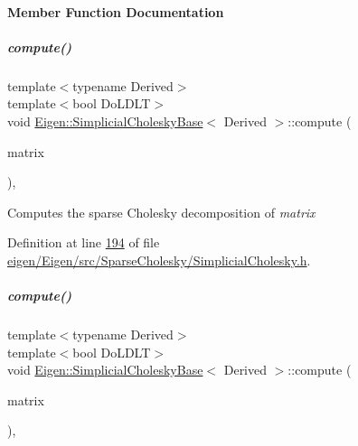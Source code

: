 \paragraph{Member Function Documentation}
\mbox{\label{group___sparse_cholesky___module_a9a741744dda2261cae26cddf96a35bf0}} 
\subparagraph{\texorpdfstring{compute()}{compute()}\hspace{0.1cm}{\footnotesize\ttfamily [1/2]}}
{\footnotesize\ttfamily template$<$typename Derived$>$ \\
template$<$bool Do\+L\+D\+LT$>$ \\
void \hyperlink{group___sparse_cholesky___module_class_eigen_1_1_simplicial_cholesky_base}{Eigen\+::\+Simplicial\+Cholesky\+Base}$<$ Derived $>$\+::compute (\begin{DoxyParamCaption}\item[{const Matrix\+Type \&}]{matrix }\end{DoxyParamCaption})\hspace{0.3cm}{\ttfamily [inline]}, {\ttfamily [protected]}}

Computes the sparse Cholesky decomposition of {\itshape matrix} 

Definition at line \hyperlink{eigen_2_eigen_2src_2_sparse_cholesky_2_simplicial_cholesky_8h_source_l00194}{194} of file \hyperlink{eigen_2_eigen_2src_2_sparse_cholesky_2_simplicial_cholesky_8h_source}{eigen/\+Eigen/src/\+Sparse\+Cholesky/\+Simplicial\+Cholesky.\+h}.

\mbox{\label{group___sparse_cholesky___module_a9a741744dda2261cae26cddf96a35bf0}} 
\subparagraph{\texorpdfstring{compute()}{compute()}\hspace{0.1cm}{\footnotesize\ttfamily [2/2]}}
{\footnotesize\ttfamily template$<$typename Derived$>$ \\
template$<$bool Do\+L\+D\+LT$>$ \\
void \hyperlink{group___sparse_cholesky___module_class_eigen_1_1_simplicial_cholesky_base}{Eigen\+::\+Simplicial\+Cholesky\+Base}$<$ Derived $>$\+::compute (\begin{DoxyParamCaption}\item[{const Matrix\+Type \&}]{matrix }\end{DoxyParamCaption})\hspace{0.3cm}{\ttfamily [inline]}, {\ttfamily [protected]}}

